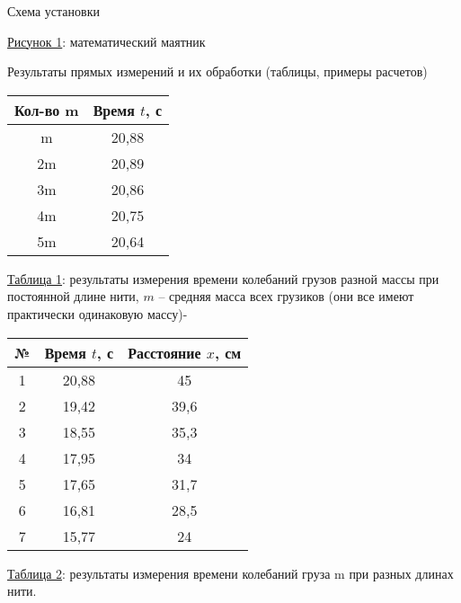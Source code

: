 \documentclass[12pt]{article}
\begin{document}
    \begin{point}{Схема установки} \\
        \begin{center}
        \underline{Рисунок 1}: математический маятник
        \end{center}
    \end{point}
    
    \begin{point}{Результаты прямых измерений и их обработки (таблицы, примеры расчетов)} \\
        \begin{minipage}{0.5\textwidth}
        \begin{center}
            \begin{tabular}{|c|c|}
            \hline
                Кол-во m & Время $t$, с \\
            \hline
                 m & 20,88 \\
                2m & 20,89 \\
                3m & 20,86 \\
                4m & 20,75 \\
                5m & 20,64 \\
            \hline
            \end{tabular}
        \end{center}
        \begin{center}
            \underline{Таблица 1}: результаты измерения времени колебаний грузов разной массы при постоянной длине нити, $m$ -- средняя масса всех грузиков (они все имеют практически одинаковую массу)-
        \end{center}
        \end{minipage}
        \begin{minipage}{0.5\textwidth}
        \begin{center}
            \begin{tabular}{|c|c|c|}
            \hline
                 № & Время $t$, с &  Расстояние $x$, см \\
            \hline
                1 & 20,88 & 45 \\
                2 & 19,42 & 39,6 \\
                3 & 18,55 & 35,3 \\
                4 & 17,95 & 34 \\
                5 & 17,65 & 31,7 \\
                6 & 16,81 & 28,5 \\
                7 & 15,77 & 24 \\
            \hline
            \end{tabular}
        \end{center}
        \begin{center}
            \underline{Таблица 2}: результаты измерения времени колебаний груза m при разных длинах нити.
        \end{center}
        \end{minipage}
        
    \end{point}
    
\end{document}
